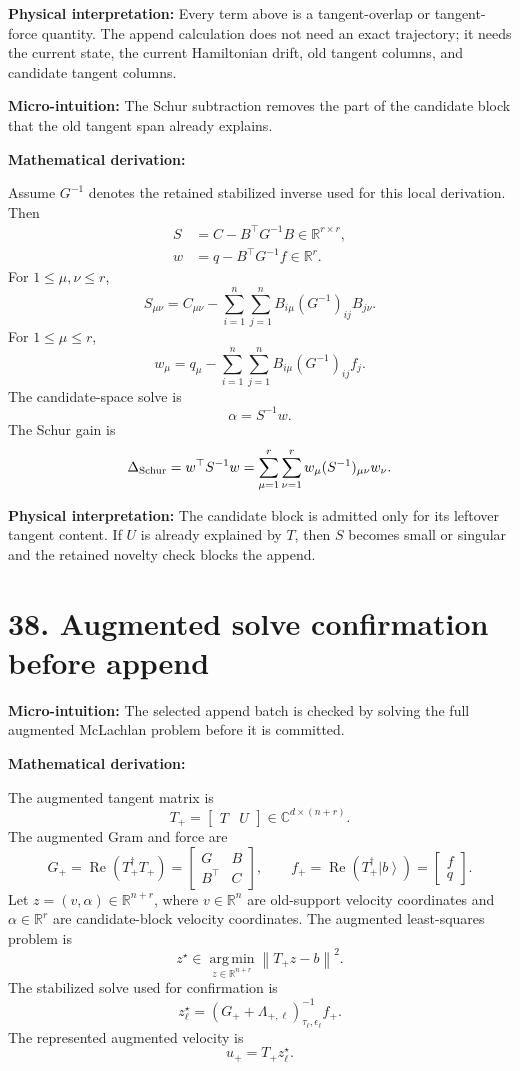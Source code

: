 \documentclass[10pt,twocolumn]{article}
\newcommand{\ket}[1]{\left|#1\right\rangle}
\newcommand{\norm}[1]{\left\lVert #1\right\rVert}
\newcommand{\R}{\mathbb R}
\newcommand{\C}{\mathbb C}
\newcommand{\argmin}{\operatorname*{arg\,min}}
\newcommand{\Real}{\operatorname{Re}}
\newcommand{\micro}[1]{%
  \par\smallskip
  \noindent\textcolor{deepblue}{\textbf{Micro-intuition:}} #1
  \par\smallskip}
\newcommand{\deriv}{%
  \par\noindent\textcolor{deepviolet}{\textbf{Mathematical derivation:}}\par\vspace{-1mm}}
\newcommand{\phys}[1]{%
  \par\smallskip
  \noindent\textcolor{deepgreen}{\textbf{Physical interpretation:}} #1
  \par\smallskip}
\begin{document}
\phys{Every term above is a tangent-overlap or tangent-force quantity. The
append calculation does not need an exact trajectory; it needs the current
state, the current Hamiltonian drift, old tangent columns, and candidate
tangent columns.}

\micro{The Schur subtraction removes the part of the candidate block that the
old tangent span already explains.}

\deriv
Assume \(G^{-1}\) denotes the retained stabilized inverse used for this local
derivation. Then
\[
\begin{aligned}
S&=C-B^\top G^{-1}B\in\R^{r\times r},\\
w&=q-B^\top G^{-1}f\in\R^r.
\end{aligned}
\]
For \(1\le\mu,\nu\le r\),
\[
S_{\mu\nu}
=
C_{\mu\nu}
-
\sum_{i=1}^{n}\sum_{j=1}^{n}
B_{i\mu}(G^{-1})_{ij}B_{j\nu}.
\]
For \(1\le\mu\le r\),
\[
w_\mu
=
q_\mu
-
\sum_{i=1}^{n}\sum_{j=1}^{n}
B_{i\mu}(G^{-1})_{ij}f_j.
\]
The candidate-space solve is
\[
\alpha=S^{-1}w.
\]
The Schur gain is
\[
\Delta_{\rm Schur}
=
w^\top S^{-1}w
=
\sum_{\mu=1}^{r}\sum_{\nu=1}^{r}
w_\mu(S^{-1})_{\mu\nu}w_\nu.
\]

\phys{The candidate block is admitted only for its leftover tangent content.
If \(U\) is already explained by \(T\), then \(S\) becomes small or singular and
the retained novelty check blocks the append.}

\section*{38. Augmented solve confirmation before append}

\micro{The selected append batch is checked by solving the full augmented
McLachlan problem before it is committed.}

\deriv
The augmented tangent matrix is
\[
T_+=
\begin{bmatrix}
T&U
\end{bmatrix}
\in\C^{d\times(n+r)}.
\]
The augmented Gram and force are
\[
G_+
=
\Real(T_+^\dagger T_+)
=
\begin{bmatrix}
G&B\\
B^\top&C
\end{bmatrix},
\qquad
f_+
=
\Real(T_+^\dagger\ket b)
=
\begin{bmatrix}
f\\
q
\end{bmatrix}.
\]
Let \(z=(v,\alpha)\in\R^{n+r}\), where \(v\in\R^n\) are old-support velocity
coordinates and \(\alpha\in\R^r\) are candidate-block velocity coordinates. The
augmented least-squares problem is
\[
z^\star
\in
\argmin_{z\in\R^{n+r}}\norm{T_+z-b}^2.
\]
The stabilized solve used for confirmation is
\[
z^\star_\ell
=
(G_++\Lambda_{+,\ell})_{\tau_\ell,\epsilon_\ell}^{-1}f_+.
\]
The represented augmented velocity is
\[
u_+=T_+z^\star_\ell.
\]
\end{document}
